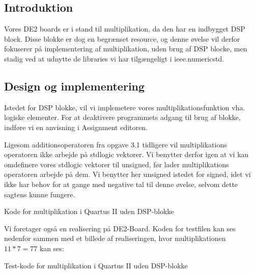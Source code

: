 \documentclass[../journal2.tex]{subfiles}
\begin{document}
\subsection{Introduktion}

Vores DE2 boards er i stand til multiplikation, da den har en indbygget DSP block. Disse blokke er dog en begrænset resource, og denne øvelse vil derfor fokuserer på implementering af multiplikation, uden brug af DSP blocke, men stadig ved at udnytte de libraries vi har tilgængeligt i ieee.numeric\textunderscore std.

\subsection{Design og implementering}

Istedet for DSP blokke, vil vi implemetere vores multiplikationsfunktion vha. logiske elementer. For at deaktivere programmets adgang til brug af blokke, indføre vi en anvisning i Assignment editoren.


Ligesom additionsoperatoren fra opgave 3.1 tidligere vil multiplikations operatoren ikke arbejde på std\textunderscore logic vektorer. Vi benytter derfor igen at vi kan omdefinere vores std\textunderscore logic vektorer til unsigned, før lader multiplikations operatoren arbejde på dem. Vi benytter her unsigned istedet for signed, idet vi ikke har behov for at gange med negative tal til denne øvelse, selvom dette sagtens kunne fungere.

\begin{table}[H]
    \centering
      \framebox{
        \rule{8pt}{0pt}
          
}
  \caption{Kode for multiplikation i Quartus II uden DSP-blokke}	
  \label{src:Tab1}
\end{table}

Vi foretager også en realisering på DE2-Board. Koden for testfilen kan ses nedenfor sammen med et billede af realiseringen, hvor multiplikationen $11*7=77$ kan ses:


\begin{table}[H]
    \centering
      \framebox{
        \rule{8pt}{0pt}
          
}
  \caption{Test-kode for multiplikation i Quartus II uden DSP-blokke}	
  \label{src:Tab2}
\end{table}
\end{document}
